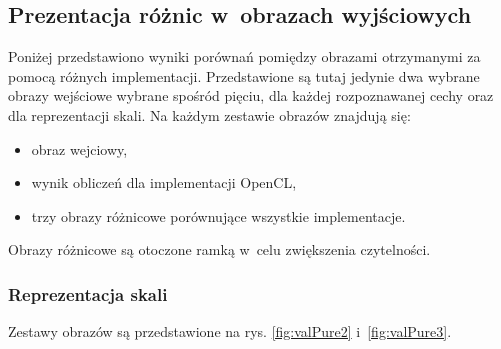 \subsection{Prezentacja różnic w~obrazach wyjściowych}
\label{subsec:prezentacjaObrazowRoznicowych}

Poniżej przedstawiono wyniki porównań pomiędzy obrazami otrzymanymi za pomocą różnych implementacji. Przedstawione są tutaj jedynie dwa wybrane obrazy wejściowe wybrane spośród pięciu, dla każdej rozpoznawanej cechy oraz dla reprezentacji skali. Na każdym zestawie obrazów znajdują się:
\begin{itemize}
\item obraz wejciowy,
\item wynik obliczeń dla implementacji OpenCL,
\item trzy obrazy różnicowe porównujące wszystkie implementacje.
\end{itemize}

Obrazy różnicowe są otoczone ramką w~celu zwiększenia czytelności.

\subsubsection{Reprezentacja skali}
\label{subsubsec:reprezentacjaSkaliRysunki}

Zestawy obrazów są przedstawione na rys. \ref{fig:valPure2} i~\ref{fig:valPure3}. 

